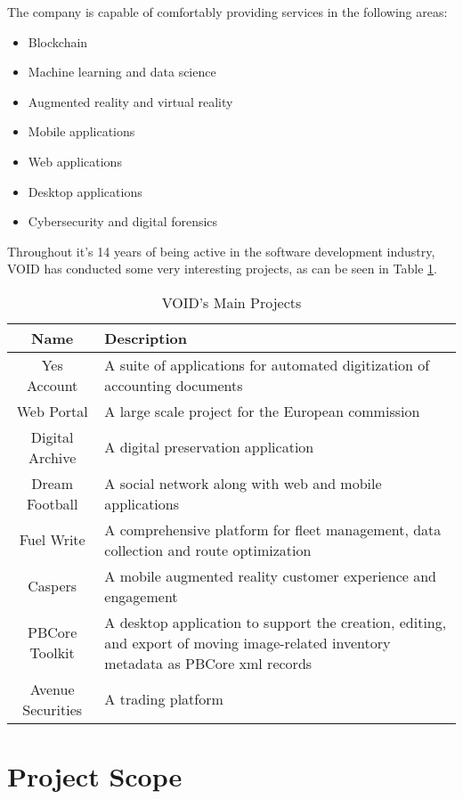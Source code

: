 The company is capable of comfortably providing services in the following areas:
\begin{itemize}
 \item Blockchain
 \item Machine learning and data science
 \item Augmented reality and virtual reality
 \item Mobile applications
 \item Web applications
 \item Desktop applications
 \item Cybersecurity and digital forensics
\end{itemize}

Throughout it's 14 years of being active in the software development industry, VOID has conducted some very interesting projects, as can be seen in Table \ref{tab:voidProjects}.

\begin{table}[ht]
  \begin{tabularx}{\textwidth}{@{}|c| *1{>{\centering\arraybackslash}X}@{}|}
    \hline
    \textbf{Name} & \textbf{Description} \\
    \hline\hline
    Yes Account & A suite of applications for automated digitization of accounting documents \\
    \hline
    Web Portal & A large scale project for the European commission \\
    \hline
    Digital Archive & A digital preservation application \\
    \hline
    Dream Football & A social network along with web and mobile applications  \\
    \hline
    Fuel Write & A comprehensive platform for fleet management, data collection and route optimization \\
    \hline
    Caspers & A mobile augmented reality customer experience and engagement \\
    \hline
    PBCore Toolkit & A desktop application to support the creation, editing, and export of moving image-related inventory metadata as PBCore \acrshort{xml} records \\
    \hline
    Avenue Securities & A trading platform \\
    \hline
  \end{tabularx}
  \caption{VOID's Main Projects}
  \label{tab:voidProjects}
\end{table}

\section{Project Scope}

